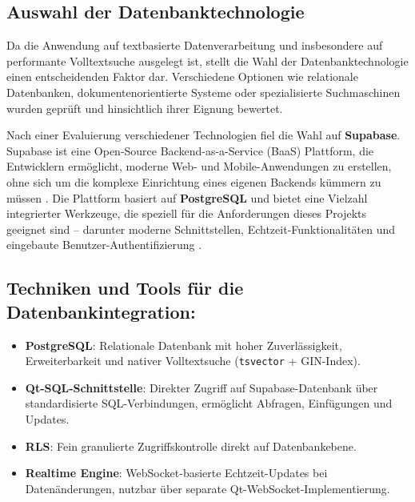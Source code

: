 \subsection{Auswahl der Datenbanktechnologie}
\label{sec:loesung:db_auswahl}
Da die  Anwendung auf textbasierte Datenverarbeitung und insbesondere
auf performante Volltextsuche ausgelegt ist, stellt die Wahl der
Datenbanktechnologie einen entscheidenden Faktor dar. Verschiedene Optionen
wie relationale Datenbanken, dokumentenorientierte Systeme oder spezialisierte
Suchmaschinen wurden geprüft und hinsichtlich ihrer Eignung bewertet.

Nach einer Evaluierung verschiedener Technologien fiel die Wahl auf \textbf{Supabase}. Supabase ist eine Open-Source Backend-as-a-Service (BaaS) Plattform, die Entwicklern ermöglicht, moderne Web- und Mobile-Anwendungen zu erstellen, ohne sich um die komplexe Einrichtung eines eigenen Backends kümmern zu müssen \cite{supabaseLeWagon2025}. Die Plattform basiert auf \textbf{PostgreSQL} und bietet eine Vielzahl integrierter Werkzeuge, die speziell für die Anforderungen dieses Projekts geeignet sind – darunter moderne Schnittstellen, Echtzeit-Funktionalitäten und eingebaute Benutzer-Authentifizierung \cite{supabaseDocs2025}.

\subsection{Techniken und Tools für die Datenbankintegration:}
\begin{itemize}
  \item \textbf{PostgreSQL}: Relationale Datenbank mit hoher Zuverlässigkeit, Erweiterbarkeit und nativer Volltextsuche (\texttt{tsvector} + GIN-Index).
  \item \textbf{Qt-SQL-Schnittstelle}: Direkter Zugriff auf Supabase-Datenbank über standardisierte SQL-Verbindungen, ermöglicht Abfragen, Einfügungen und Updates.
  \item \textbf{\ac{RLS}}: Fein granulierte Zugriffskontrolle direkt auf Datenbankebene.
  \item \textbf{Realtime Engine}: WebSocket-basierte Echtzeit-Updates bei Datenänderungen, nutzbar über separate Qt-WebSocket-Implementierung.
\end{itemize}

